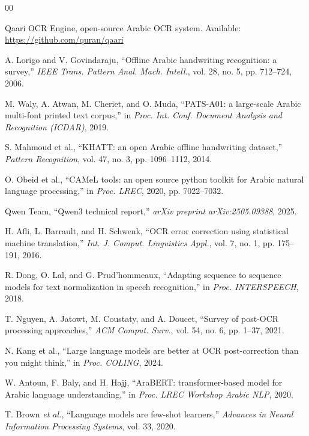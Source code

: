 \documentclass[conference]{IEEEtran}
\begin{document}
\begin{thebibliography}{00}

Qaari OCR Engine, open-source Arabic OCR system.
Available: \url{https://github.com/quran/qaari}

A. Lorigo and V. Govindaraju, ``Offline Arabic handwriting recognition: a survey,''
\textit{IEEE Trans. Pattern Anal. Mach. Intell.}, vol. 28, no. 5, pp. 712--724, 2006.

M. Waly, A. Atwan, M. Cheriet, and O. Muda, ``PATS-A01: a large-scale Arabic
multi-font printed text corpus,'' in \textit{Proc. Int. Conf. Document Analysis
and Recognition (ICDAR)}, 2019.

S. Mahmoud et al., ``KHATT: an open Arabic offline handwriting dataset,''
\textit{Pattern Recognition}, vol. 47, no. 3, pp. 1096--1112, 2014.

O. Obeid et al., ``CAMeL tools: an open source python toolkit for
Arabic natural language processing,'' in \textit{Proc. LREC}, 2020, pp. 7022--7032.

Qwen Team, ``Qwen3 technical report,'' \textit{arXiv preprint arXiv:2505.09388},
2025.

H. Afli, L. Barrault, and H. Schwenk, ``OCR error correction using statistical
machine translation,'' \textit{Int. J. Comput. Linguistics Appl.}, vol. 7, no. 1,
pp. 175--191, 2016.

R. Dong, O. Lal, and G. Prud'hommeaux, ``Adapting sequence to sequence models
for text normalization in speech recognition,'' in \textit{Proc. INTERSPEECH}, 2018.

T. Nguyen, A. Jatowt, M. Coustaty, and A. Doucet, ``Survey of post-OCR processing
approaches,'' \textit{ACM Comput. Surv.}, vol. 54, no. 6, pp. 1--37, 2021.

N. Kang et al., ``Large language models are better at OCR post-correction than you
might think,'' in \textit{Proc. COLING}, 2024.

W. Antoun, F. Baly, and H. Hajj, ``AraBERT: transformer-based model for Arabic language understanding,''
in \textit{Proc. LREC Workshop Arabic NLP}, 2020.

T. Brown \textit{et al.}, ``Language models are few-shot learners,''
\textit{Advances in Neural Information Processing Systems}, vol. 33, 2020.


\end{thebibliography}
\end{document}
